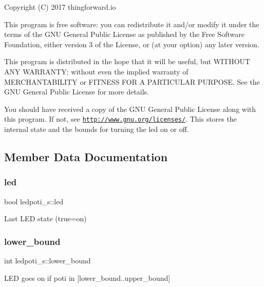 Copyright (C) 2017 thingforward.\+io

This program is free software\+: you can redistribute it and/or modify it under the terms of the G\+NU General Public License as published by the Free Software Foundation, either version 3 of the License, or (at your option) any later version.

This program is distributed in the hope that it will be useful, but W\+I\+T\+H\+O\+UT A\+NY W\+A\+R\+R\+A\+N\+TY; without even the implied warranty of M\+E\+R\+C\+H\+A\+N\+T\+A\+B\+I\+L\+I\+TY or F\+I\+T\+N\+E\+SS F\+OR A P\+A\+R\+T\+I\+C\+U\+L\+AR P\+U\+R\+P\+O\+SE. See the G\+NU General Public License for more details.

You should have received a copy of the G\+NU General Public License along with this program. If not, see \href{http://www.gnu.org/licenses/}{\tt http\+://www.\+gnu.\+org/licenses/}. This stores the internal state and the bounds for turning the led on or off. 

\subsection{Member Data Documentation}
\mbox{\label{structledpoti__s_a323939ea414113ee4c4ab2459c593886}} 
\subsubsection{\texorpdfstring{led}{led}}
{\footnotesize\ttfamily bool ledpoti\+\_\+s\+::led}

Last L\+ED state (true=on) \mbox{\label{structledpoti__s_a877ef064792684db1fe8ca3b9af45897}} 
\subsubsection{\texorpdfstring{lower\+\_\+bound}{lower\_bound}}
{\footnotesize\ttfamily int ledpoti\+\_\+s\+::lower\+\_\+bound}

L\+ED goes on if poti in \mbox{[}lower\+\_\+bound..upper\+\_\+bound\mbox{]} \mbox{\label{structledpoti__s_a68de5489c63aee62e5da18f9b4fe6fa9}} 
